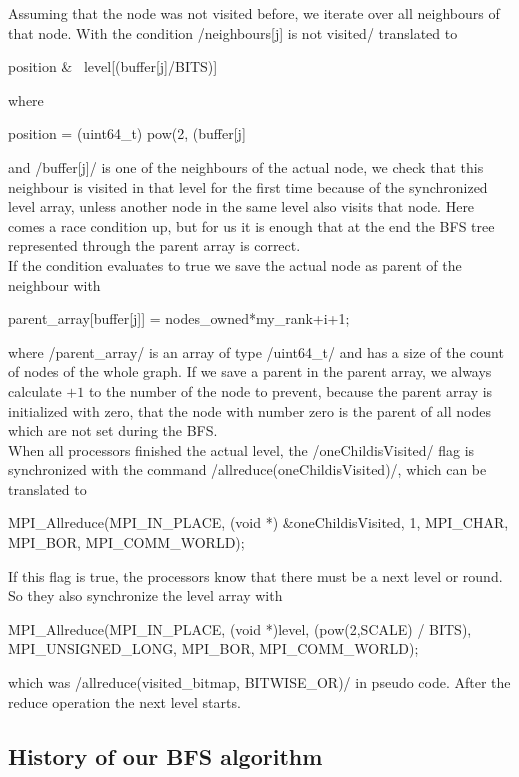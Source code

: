 \documentclass[12pt,a4paper]{article}
\begin{document}
Assuming that the node was not visited before, we iterate over all neighbours of that node. With the condition \cinline/neighbours[j] is not visited/ translated to
\begin{ccode}
position & ~level[(buffer[j]/BITS)]
\end{ccode}
where
\begin{ccode}
position = (uint64_t) pow(2, (buffer[j] %
\end{ccode}
and \cinline/buffer[j]/ is one of the neighbours of the actual node, we check that this neighbour is visited in that level for the first time because of the synchronized level array, unless another node in the same level also visits that node. Here comes a race condition up, but for us it is enough that at the end the BFS tree represented through the parent array is correct.\\
If the condition evaluates to true we save the actual node as parent of the neighbour with
\begin{ccode}
parent_array[buffer[j]] = nodes_owned*my_rank+i+1;
\end{ccode}
where \cinline/parent_array/ is an array of type \cinline/uint64_t/ and has a size of the count of nodes of the whole graph. If we save a parent in the parent array, we always calculate \(+1\) to the number of the node to prevent, because the parent array is initialized with zero, that the node with number zero is the parent of all nodes which are not set during the BFS.\\
When all processors finished the actual level, the \cinline/oneChildisVisited/ flag is synchronized with the command \cinline/allreduce(oneChildisVisited)/, which can be translated to
\begin{ccode}
MPI_Allreduce(MPI_IN_PLACE, (void *) &oneChildisVisited, 1, MPI_CHAR, MPI_BOR, MPI_COMM_WORLD);
\end{ccode}
If this flag is true, the processors know that there must be a next level or round. So they also synchronize the level array with
\begin{ccode}
MPI_Allreduce(MPI_IN_PLACE, (void *)level, (pow(2,SCALE) / BITS), MPI_UNSIGNED_LONG, MPI_BOR, MPI_COMM_WORLD);
\end{ccode}
which was \cinline/allreduce(visited_bitmap, BITWISE_OR)/ in pseudo code. After the reduce operation the next level starts.

\subsection{History of our BFS algorithm}
\end{document}

